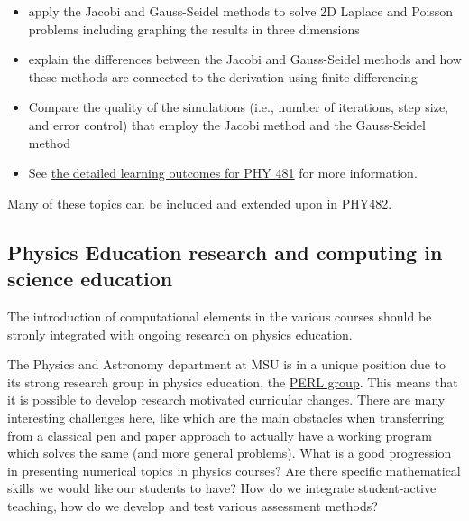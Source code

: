 \documentclass[%
oneside,                 %
final,                   %
10pt]{article}
\begin{document}
\begin{itemize}
  \item apply the Jacobi and Gauss-Seidel methods to solve 2D Laplace and Poisson problems including graphing the results in three dimensions

  \item explain the differences between the Jacobi and Gauss-Seidel methods and how these methods are connected to the derivation using finite differencing

  \item Compare the quality of the simulations (i.e., number of iterations, step size, and error control) that employ the Jacobi method and the Gauss-Seidel method

  \item See \href{{https://dannycab.github.io/phy481msu/learning_goals.html}}{the detailed learning outcomes for PHY 481} for more information.
\end{itemize}

\noindent
Many of these topics can be included and extended upon in PHY482. 

% 
% 

\subsection*{Physics Education research and computing in science education}

The introduction of computational elements in the various courses should be stronly integrated with ongoing research on physics education.

The Physics and Astronomy department at MSU is in a unique position due to its strong research group in physics education, the \href{{http://www.pa.msu.edu/research/physics-education-lab}}{PERL group}.
This means that it is possible to
develop research motivated curricular changes.  There are many interesting challenges here, like
which are the main obstacles when transferring from a classical pen and paper approach to actually have a working program which solves the same (and more general problems). What is a good progression in presenting numerical topics in physics courses? Are there specific mathematical skills we would like our students to have? How do we integrate student-active teaching, how do we develop and test various assessment methods?
\end{document}
